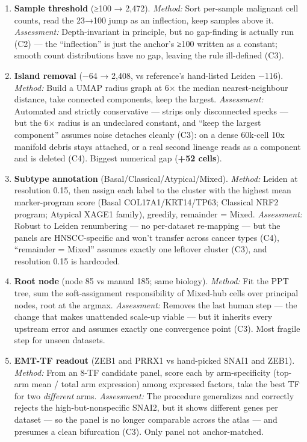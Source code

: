 \documentclass[11pt,a4paper]{article}
\providecommand{\tightlist}{\setlength{\itemsep}{0pt}\setlength{\parskip}{0pt}}
\begin{document}
\begin{enumerate}
\def\labelenumi{\arabic{enumi}.}
\tightlist
\item
  \textbf{Sample threshold} (≥100 → 2,472). \emph{Method:} Sort
  per-sample malignant cell counts, read the 23→100 jump as an
  inflection, keep samples above it. \emph{Assessment:} Depth-invariant
  in principle, but no gap-finding is actually run (C2) --- the
  ``inflection'' is just the anchor's ≥100 written as a constant; smooth
  count distributions have no gap, leaving the rule ill-defined (C3).
\item
  \textbf{Island removal} (−64 → 2,408, vs reference's hand-listed
  Leiden −116). \emph{Method:} Build a UMAP radius graph at 6× the
  median nearest-neighbour distance, take connected components, keep the
  largest. \emph{Assessment:} Automated and strictly conservative ---
  strips only disconnected specks --- but the 6× radius is an undeclared
  constant, and ``keep the largest component'' assumes noise detaches
  cleanly (C3): on a dense 60k-cell 10x manifold debris stays attached,
  or a real second lineage reads as a component and is deleted (C4).
  Biggest numerical gap (\textbf{+52 cells}).
\item
  \textbf{Subtype annotation} (Basal/Classical/Atypical/Mixed).
  \emph{Method:} Leiden at resolution 0.15, then assign each label to
  the cluster with the highest mean marker-program score (Basal
  COL17A1/KRT14/TP63; Classical NRF2 program; Atypical XAGE1 family),
  greedily, remainder = Mixed. \emph{Assessment:} Robust to Leiden
  renumbering --- no per-dataset re-mapping --- but the panels are
  HNSCC-specific and won't transfer across cancer types (C4),
  ``remainder = Mixed'' assumes exactly one leftover cluster (C3), and
  resolution 0.15 is hardcoded.
\item
  \textbf{Root node} (node 85 vs manual 185; same biology).
  \emph{Method:} Fit the PPT tree, sum the soft-assignment
  responsibility of Mixed-hub cells over principal nodes, root at the
  argmax. \emph{Assessment:} Removes the last human step --- the change
  that makes unattended scale-up viable --- but it inherits every
  upstream error and assumes exactly one convergence point (C3). Most
  fragile step for unseen datasets.
\item
  \textbf{EMT-TF readout} (ZEB1 and PRRX1 vs hand-picked SNAI1 and ZEB1).
  \emph{Method:} From an 8-TF candidate panel, score each by
  arm-specificity (top-arm mean / total arm expression) among expressed
  factors, take the best TF for two \emph{different} arms.
  \emph{Assessment:} The procedure generalizes and correctly rejects the
  high-but-nonspecific SNAI2, but it shows different genes per dataset
  --- so the panel is no longer comparable across the atlas --- and
  presumes a clean bifurcation (C3). Only panel not anchor-matched.
\end{enumerate}
\end{document}
